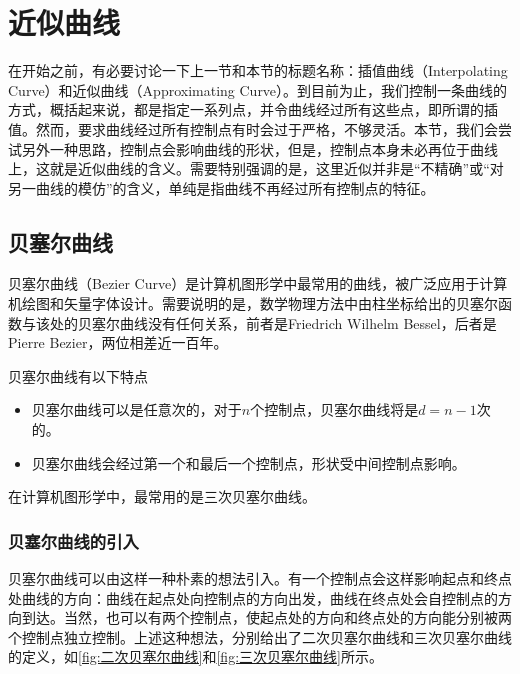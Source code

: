 \section{近似曲线}
在开始之前，有必要讨论一下上一节和本节的标题名称：插值曲线（Interpolating Curve）和近似曲线（Approximating Curve）。到目前为止，我们控制一条曲线的方式，概括起来说，都是指定一系列点，并令曲线经过所有这些点，即所谓的插值。然而，要求曲线经过所有控制点有时会过于严格，不够灵活。本节，我们会尝试另外一种思路，控制点会影响曲线的形状，但是，控制点本身未必再位于曲线上，这就是近似曲线的含义。需要特别强调的是，这里近似并非是“不精确”或“对另一曲线的模仿”的含义，单纯是指曲线不再经过所有控制点的特征。


\subsection{贝塞尔曲线}
贝塞尔曲线（Bezier Curve）是计算机图形学中最常用的曲线，被广泛应用于计算机绘图和矢量字体设计。需要说明的是，数学物理方法中由柱坐标给出的贝塞尔函数与该处的贝塞尔曲线没有任何关系，前者是Friedrich Wilhelm Bessel，后者是Pierre Bezier，两位相差近一百年。

贝塞尔曲线有以下特点
\begin{itemize}
    \item 贝塞尔曲线可以是任意次的，对于$n$个控制点，贝塞尔曲线将是$d=n-1$次的。
    \item 贝塞尔曲线会经过第一个和最后一个控制点，形状受中间控制点影响。
\end{itemize}

在计算机图形学中，最常用的是三次贝塞尔曲线。

\subsubsection{贝塞尔曲线的引入}
贝塞尔曲线可以由这样一种朴素的想法引入。有一个控制点会这样影响起点和终点处曲线的方向：曲线在起点处向控制点的方向出发，曲线在终点处会自控制点的方向到达。当然，也可以有两个控制点，使起点处的方向和终点处的方向能分别被两个控制点独立控制。上述这种想法，分别给出了二次贝塞尔曲线和三次贝塞尔曲线的定义，如\cref{fig:二次贝塞尔曲线}和\cref{fig:三次贝塞尔曲线}所示。
\begin{Figure}[贝塞尔曲线]
    \hspace{1cm}
\end{Figure}

